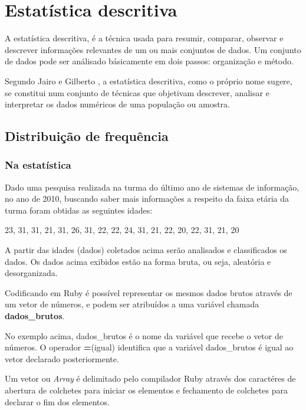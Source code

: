\documentclass[12pt]{article}
\newcommand{\code}[1] {\textbf{#1}}
\begin{document}
\chapter{Estatística descritiva}

A estatística descritiva, é a técnica usada para resumir, comparar, observar e descrever informações relevantes de um ou mais conjuntos de dados. Um conjunto de dados pode ser análisado básicamente em dois passos: organização e método.

Segundo Jairo e Gilberto \cite{cursoEstatistica}, a estatística descritiva, como o próprio nome sugere, se constitui num conjunto de técnicas que objetivam descrever, analisar e interpretar os dados numéricos de uma população ou amostra.


\section{ Distribuição de frequência } 

\subsection { Na estatística }

Dado uma pesquisa realizada na turma do último ano de sistemas de informação, no ano de 2010, buscando saber mais informações a respeito da faixa etária da turma foram obtidas as seguintes idades:

23, 31, 31, 21, 31, 26, 31, 22, 22, 24, 31, 21, 22, 20, 22, 31, 21, 20

A partir das idades (dados) coletados acima serão analisados e classificados os dados. Os dados acima exibidos estão na forma bruta, ou seja, aleatória e desorganizada. 

Codificando em Ruby é possível representar os mesmos dados brutos através de um vetor de números, e podem ser atribuídos a uma variável chamada \code{dados\_brutos}.

 

No exemplo acima, dados\_brutos é o nome da variável que recebe o vetor de números. O operador \code{=}(igual) identifica que a variável dados\_brutos é igual ao vetor declarado posteriormente.

Um vetor ou \textit{Array} é delimitado pelo compilador Ruby através dos caractéres de abertura de colchetes para iniciar os elementos e fechamento de colchetes para declarar o fim dos elementos.
\end{document}
